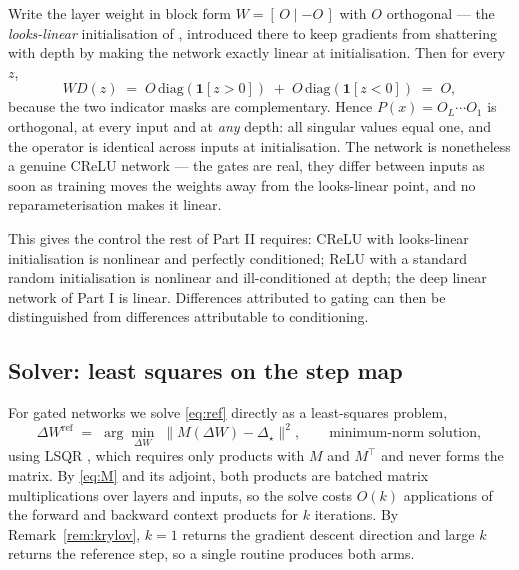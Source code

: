 \documentclass{article} %
\theoremstyle{plain}
\theoremstyle{definition}
\theoremstyle{remark}
\begin{document}
Write the layer weight in block form $W = [\,O \mid -O\,]$ with $O$ orthogonal --- the
\emph{looks-linear} initialisation of \citet{balduzzi2017shattered}, introduced there to keep
gradients from shattering with depth by making the network exactly linear at initialisation. Then for every $z$,
\begin{equation}
  W D(z) \;=\; O\,\mathrm{diag}(\mathbf{1}[z>0]) \;+\; O\,\mathrm{diag}(\mathbf{1}[z<0]) \;=\; O ,
\end{equation}
because the two indicator masks are complementary. Hence $P(x) = O_L \cdots O_1$ is orthogonal, at
every input and at \emph{any} depth: all singular values equal one, and the operator is identical
across inputs at initialisation. The network is nonetheless a genuine CReLU network --- the gates
are real, they differ between inputs as soon as training moves the weights away from the
looks-linear point, and no reparameterisation makes it linear.

This gives the control the rest of Part II requires: CReLU with looks-linear initialisation is
nonlinear and perfectly conditioned; ReLU with a standard random initialisation is nonlinear and
ill-conditioned at depth; the deep linear network of Part I is linear. Differences attributed to
gating can then be distinguished from differences attributable to conditioning.

\subsection{Solver: least squares on the step map}
\label{sec:s2}

For gated networks we solve \eqref{eq:ref} directly as a least-squares problem,
\begin{equation}
  \Delta W^{\mathrm{ref}} \;=\; \arg\min_{\Delta W} \; \big\|M(\Delta W) - \Delta_\star\big\|^2 ,
  \qquad \text{minimum-norm solution},
\end{equation}
using LSQR \citep{paige1982lsqr}, which requires only products with $M$ and $M^\top$ and never
forms the matrix. By \eqref{eq:M} and its adjoint, both products are batched matrix
multiplications over layers and inputs, so the solve costs $O(k)$ applications of the forward and
backward context products for $k$ iterations. By Remark~\ref{rem:krylov}, $k = 1$ returns the
gradient descent direction and large $k$ returns the reference step, so a single routine produces
both arms.
\end{document}
